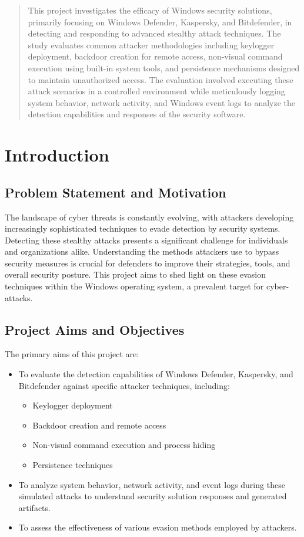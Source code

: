 \documentclass[11pt]{article}
\begin{document}
	\justifying
	
	\tableofcontents
	\newpage
	\listoffigures
	\newpage
	
	\begin{abstract}
		This project investigates the efficacy of Windows security solutions, primarily focusing on Windows Defender, Kaspersky, and Bitdefender, in detecting and responding to advanced stealthy attack techniques. The study evaluates common attacker methodologies including keylogger deployment, backdoor creation for remote access, non-visual command execution using built-in system tools, and persistence mechanisms designed to maintain unauthorized access. The evaluation involved executing these attack scenarios in a controlled environment while meticulously logging system behavior, network activity, and Windows event logs to analyze the detection capabilities and responses of the security software.
	\end{abstract}
	
	\newpage
	\section{Introduction}
	\subsection{Problem Statement and Motivation}
	The landscape of cyber threats is constantly evolving, with attackers developing increasingly sophisticated techniques to evade detection by security systems. Detecting these stealthy attacks presents a significant challenge for individuals and organizations alike. Understanding the methods attackers use to bypass security measures is crucial for defenders to improve their strategies, tools, and overall security posture. This project aims to shed light on these evasion techniques within the Windows operating system, a prevalent target for cyber-attacks.
	
	\subsection{Project Aims and Objectives}
	The primary aims of this project are:
	\begin{itemize}
		\item To evaluate the detection capabilities of Windows Defender, Kaspersky, and Bitdefender against specific attacker techniques, including:
		\begin{itemize}
			\item Keylogger deployment
			\item Backdoor creation and remote access
			\item Non-visual command execution and process hiding
			\item Persistence techniques
		\end{itemize}
		\item To analyze system behavior, network activity, and event logs during these simulated attacks to understand security solution responses and generated artifacts.
		\item To assess the effectiveness of various evasion methods employed by attackers.
	\end{itemize}
	
\end{document}
